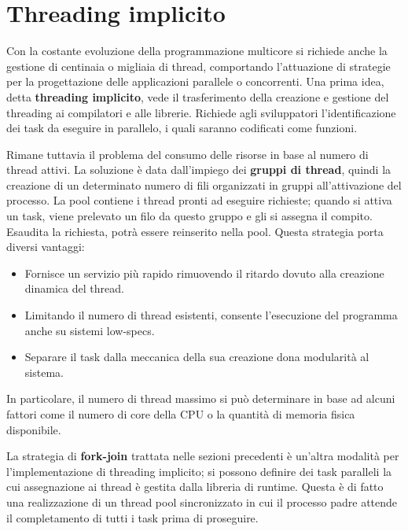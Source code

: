 %

\section{Threading implicito}
Con la costante evoluzione della programmazione multicore si richiede anche la gestione di centinaia o migliaia di thread, comportando l'attuazione di
strategie per la progettazione delle applicazioni parallele o concorrenti. Una prima idea, detta \textbf{threading implicito}, vede il trasferimento
della creazione e gestione del threading ai compilatori e alle librerie. Richiede agli sviluppatori l'identificazione dei task da eseguire in parallelo,
i quali saranno codificati come funzioni.\par
Rimane tuttavia il problema del consumo delle risorse in base al numero di thread attivi. La soluzione è data dall'impiego dei \textbf{gruppi di thread},
quindi la creazione di un determinato numero di fili organizzati in gruppi all'attivazione del processo. La pool contiene i thread pronti ad eseguire
richieste; quando si attiva un task, viene prelevato un filo da questo gruppo e gli si assegna il compito. Esaudita la richiesta, potrà essere
reinserito nella pool. Questa strategia porta diversi vantaggi: \begin{itemize}
	\item Fornisce un servizio più rapido rimuovendo il ritardo dovuto alla creazione dinamica del thread.
	\item Limitando il numero di thread esistenti, consente l'esecuzione del programma anche su sistemi low-specs.
	\item Separare il task dalla meccanica della sua creazione dona modularità al sistema.
\end{itemize}
\noindent In particolare, il numero di thread massimo si può determinare in base ad alcuni fattori come il numero di core della CPU o la quantità di
memoria fisica disponibile.\par
La strategia di \textbf{fork-join} trattata nelle sezioni precedenti è un'altra modalità per l'implementazione di threading implicito; si possono
definire dei task paralleli la cui assegnazione ai thread è gestita dalla libreria di runtime. Questa è di fatto una realizzazione di un thread pool
sincronizzato in cui il processo padre attende il completamento di tutti i task prima di proseguire.

%

